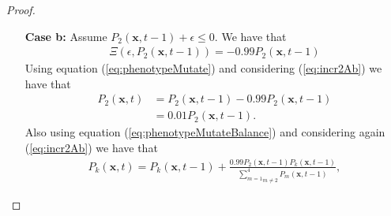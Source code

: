 \documentclass[\main/thesis.tex]{subfiles}
\begin{document}
\begin{proof}
\begin{itemize}
\begin{itemize}
\begin{itemize}
                               \item[{\bf Case b:}] Assume $P_2(\boldsymbol{x}, t{-}1) {+} \epsilon {\le} 0$.
                                                    We have that 
                                                    \begin{align*}
                                                      \Xi(\epsilon, P_2(\boldsymbol{x}, t{-}1))
                                                      {=} {\minus}0.99 P_2(\boldsymbol{x}, t{-}1)
                                                      \tag{21}
                                                      \label{eq:incr2Ab}
                                                    \end{align*}
                                                    Using equation (\ref{eq:phenotypeMutate}) and considering 
                                                    (\ref{eq:incr2Ab}) we have that
                                                    \begin{align*}
                                                      P_2(\boldsymbol{x}, t) &{=} P_2(\boldsymbol{x}, t{-}1)
                                                                              {-} 0.99 P_2(\boldsymbol{x}, t{-}1)\\
                                                                             &{=} 0.01 P_2(\boldsymbol{x}, t{-}1).
                                                      \tag{22}
                                                      \label{eq:P22Ab}
                                                    \end{align*}
                                                    Also using equation (\ref{eq:phenotypeMutateBalance}) and considering 
                                                    again (\ref{eq:incr2Ab}) we have that
                                                    \begin{align*}
                                                      P_k(\boldsymbol{x}, t) {=} P_k(\boldsymbol{x}, t{-}1) 
                                                                             {+} \frac{0.99 P_2(\boldsymbol{x}, t{-}1)
                                                                             	       P_k(\boldsymbol{x}, t{-}1)}
                                                                                      {\underset{m {\ne} 2}{\sum_{m{=}1}^4} 
                               	                                                       P_m(\boldsymbol{x}, t{-}1)},
                                                      \tag{23}

\end{align*}
\end{itemize}
\end{itemize}
\end{itemize}
\end{proof}
\end{document}
